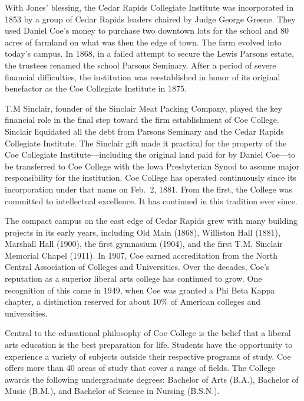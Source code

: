 \documentclass[
  letterpaper,
]{scrbook}
\begin{document}
With Jones' blessing, the Cedar Rapids Collegiate Institute was
incorporated in 1853 by a group of Cedar Rapids leaders chaired by Judge
George Greene. They used Daniel Coe's money to purchase two downtown
lots for the school and 80 acres of farmland on what was then the edge
of town. The farm evolved into today's campus. In 1868, in a failed
attempt to secure the Lewis Parsons estate, the trustees renamed the
school Parsons Seminary. After a period of severe financial
difficulties, the institution was reestablished in honor of its original
benefactor as the Coe Collegiate Institute in 1875.

T.M Sinclair, founder of the Sinclair Meat Packing Company, played the
key financial role in the final step toward the firm establishment of
Coe College. Sinclair liquidated all the debt from Parsons Seminary and
the Cedar Rapids Collegiate Institute. The Sinclair gift made it
practical for the property of the Coe Collegiate Institute---including
the original land paid for by Daniel Coe---to be transferred to Coe
College with the Iowa Presbyterian Synod to assume major responsibility
for the institution. Coe College has operated continuously since its
incorporation under that name on Feb.~2, 1881. From the first, the
College was committed to intellectual excellence. It has continued in
this tradition ever since.

The compact campus on the east edge of Cedar Rapids grew with many
building projects in its early years, including Old Main (1868),
Williston Hall (1881), Marshall Hall (1900), the first gymnasium (1904),
and the first T.M. Sinclair Memorial Chapel (1911). In 1907, Coe earned
accreditation from the North Central Association of Colleges and
Universities. Over the decades, Coe's reputation as a superior liberal
arts college has continued to grow. One recognition of this came in
1949, when Coe was granted a Phi Beta Kappa chapter, a distinction
reserved for about 10\% of American colleges and universities.

Central to the educational philosophy of Coe College is the belief that
a liberal arts education is the best preparation for life. Students have
the opportunity to experience a variety of subjects outside their
respective programs of study. Coe offers more than 40 areas of study
that cover a range of fields. The College awards the following
undergraduate degrees: Bachelor of Arts (B.A.), Bachelor of Music
(B.M.), and Bachelor of Science in Nursing (B.S.N.).
\end{document}
